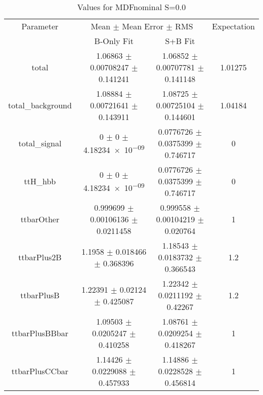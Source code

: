 \begin{table}
\centering
\caption{Values for MDFnominal S=0.0}
\begin{tabular}{cccc}
\toprule
Parameter & \multicolumn{2}{c}{Mean $\pm$ Mean Error $\pm$ RMS} & Expectation\\
 & B-Only Fit & S+B Fit & \\
\midrule
total & \num{1.06863} $\pm$ \num{0.00708247} $\pm$ \num{0.141241} & \num{1.06852} $\pm$ \num{0.00707781} $\pm$ \num{0.141148} & \num{1.01275}\\
total\_background & \num{1.08884} $\pm$ \num{0.00721641} $\pm$ \num{0.143911} & \num{1.08725} $\pm$ \num{0.00725104} $\pm$ \num{0.144601} & \num{1.04184}\\
total\_signal & \num{0} $\pm$ \num{0} $\pm$ \num{4.18234e-09} & \num{0.0776726} $\pm$ \num{0.0375399} $\pm$ \num{0.746717} & \num{0}\\
ttH\_hbb & \num{0} $\pm$ \num{0} $\pm$ \num{4.18234e-09} & \num{0.0776726} $\pm$ \num{0.0375399} $\pm$ \num{0.746717} & \num{0}\\
ttbarOther & \num{0.999699} $\pm$ \num{0.00106136} $\pm$ \num{0.0211458} & \num{0.999558} $\pm$ \num{0.00104219} $\pm$ \num{0.020764} & \num{1}\\
ttbarPlus2B & \num{1.1958} $\pm$ \num{0.018466} $\pm$ \num{0.368396} & \num{1.18543} $\pm$ \num{0.0183732} $\pm$ \num{0.366543} & \num{1.2}\\
ttbarPlusB & \num{1.22391} $\pm$ \num{0.02124} $\pm$ \num{0.425087} & \num{1.22342} $\pm$ \num{0.0211192} $\pm$ \num{0.42267} & \num{1.2}\\
ttbarPlusBBbar & \num{1.09503} $\pm$ \num{0.0205247} $\pm$ \num{0.410258} & \num{1.08761} $\pm$ \num{0.0209254} $\pm$ \num{0.418267} & \num{1}\\
ttbarPlusCCbar & \num{1.14426} $\pm$ \num{0.0229088} $\pm$ \num{0.457933} & \num{1.14886} $\pm$ \num{0.0228528} $\pm$ \num{0.456814} & \num{1}\\
\bottomrule
\end{tabular}
\end{table}